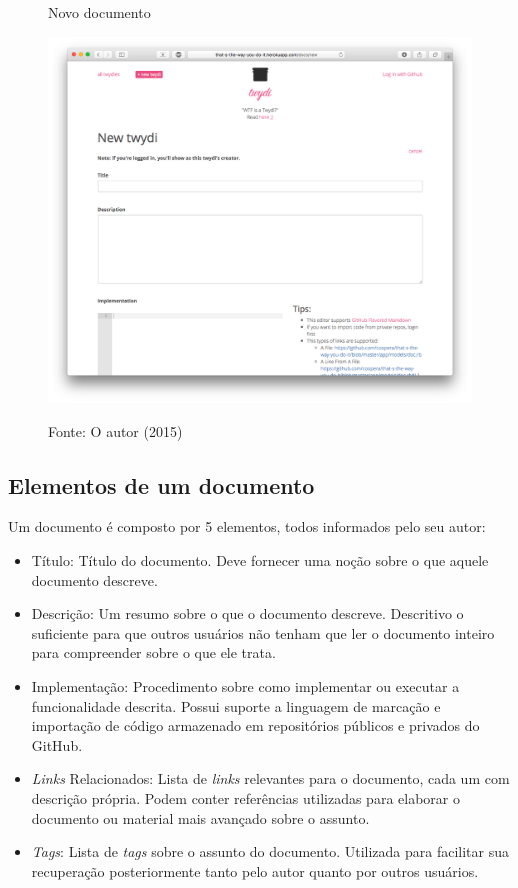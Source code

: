 \begin{figure}[hb]
	\centering
    \caption{Novo documento}
    \includegraphics[width=12cm]{Imagens/print-new-twydi.png}
		\label{fig:doc-new}
	\caption*{Fonte: O autor (2015)}
\end{figure}

\clearpage

\subsection{Elementos de um documento}

Um documento é composto por 5 elementos, todos informados pelo seu autor:

\begin{itemize}
  \item Título: Título do documento. Deve fornecer uma noção sobre o que aquele documento descreve.
  \item Descrição: Um resumo sobre o que o documento descreve. Descritivo o suficiente para que outros usuários não tenham que ler o documento inteiro para compreender sobre o que ele trata.
  \item Implementação: Procedimento sobre como implementar ou executar a funcionalidade descrita. Possui suporte a linguagem de marcação e importação de código armazenado em repositórios públicos e privados do GitHub.
   \item \textit{Links} Relacionados: Lista de \textit{links} relevantes para o documento, cada um com descrição própria. Podem conter referências utilizadas para elaborar o documento ou material mais avançado sobre o assunto.
  \item \textit{Tags}: Lista de \textit{tags} sobre o assunto do documento. Utilizada para facilitar sua recuperação posteriormente tanto pelo autor quanto por outros usuários.
\end{itemize}


